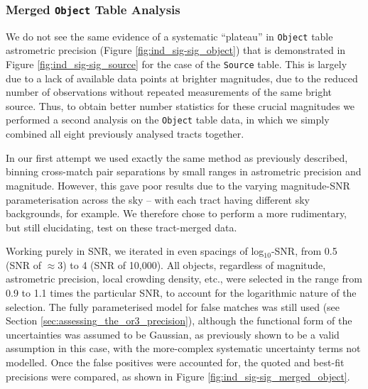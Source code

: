 \documentclass[SE,authoryear,toc]{lsstdoc}
\begin{document}
\subsubsection{Merged \texttt{Object} Table Analysis}
We do not see the same evidence of a systematic ``plateau'' in \texttt{Object} table astrometric precision (Figure \ref{fig:ind_sig-sig_object}) that is demonstrated in Figure \ref{fig:ind_sig-sig_source} for the case of the \texttt{Source} table.
This is largely due to a lack of available data points at brighter magnitudes, due to the reduced number of observations without repeated measurements of the same bright source.
Thus, to obtain better number statistics for these crucial magnitudes we performed a second analysis on the \texttt{Object} table data, in which we simply combined all eight previously analysed tracts together.

In our first attempt we used exactly the same method as previously described, binning cross-match pair separations by small ranges in astrometric precision and magnitude.
However, this gave poor results due to the varying magnitude-SNR parameterisation across the sky -- with each tract having different sky backgrounds, for example.
We therefore chose to perform a more rudimentary, but still elucidating, test on these tract-merged data.

Working purely in SNR, we iterated in even spacings of log$_{10}$-SNR, from 0.5 (SNR of $\approx3$) to 4 (SNR of 10,000).
All objects, regardless of magnitude, astrometric precision, local crowding density, etc., were selected in the range from 0.9 to 1.1 times the particular SNR, to account for the logarithmic nature of the selection.
The fully parameterised model for false matches was still used (see Section \ref{sec:assessing_the_or3_precision}), although the functional form of the uncertainties was assumed to be Gaussian, as previously shown to be a valid assumption in this case, with the more-complex systematic uncertainty terms not modelled.
Once the false positives were accounted for, the quoted and best-fit precisions were compared, as shown in Figure \ref{fig:ind_sig-sig_merged_object}.
\end{document}
